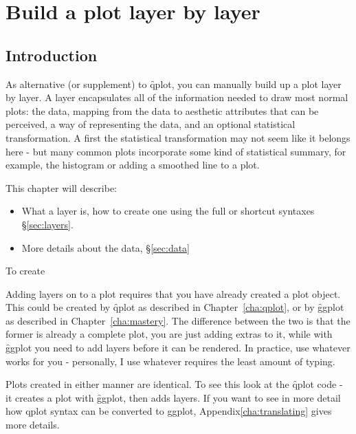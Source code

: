 


\chapter{Build a plot layer by layer}
\label{cha:layers}

\section{Introduction}

As alternative (or supplement) to \f{qplot}, you can manually build up a plot layer by layer.  A layer encapsulates all of the information needed to draw most normal plots:  the data, mapping from the data to aesthetic attributes that can be perceived, a way of representing the data, and an optional statistical transformation.  A first the statistical transformation may not seem like it belongs here - but many common plots incorporate some kind of statistical summary, for example, the histogram or adding a smoothed line to a plot.  

This chapter will describe:

\begin{itemize}
  \item What a layer is, how to create one using the full or shortcut syntaxes \S\ref{sec:layers}.

  \item More details about the data, \S\ref{sec:data}
\end{itemize}

To create 

Adding layers on to a plot requires that you have already created a plot object.  This could be created by \f{qplot} as described in Chapter~\ref{cha:qplot}, or by \f{ggplot} as described in Chapter~\ref{cha:mastery}.  The difference between the two is that the former is already a complete plot, you are just adding extras to it, while with \f{ggplot} you need to add layers before it can be rendered.  In practice, use whatever works for you - personally, I use whatever requires the least amount of typing.

Plots created in either manner are identical.  To see this look at the \f{qplot} code - it creates a plot with \f{ggplot}, then adds layers.  If you want to see in more detail how qplot syntax can be converted to ggplot, Appendix\ref{cha:translating} gives more details.

